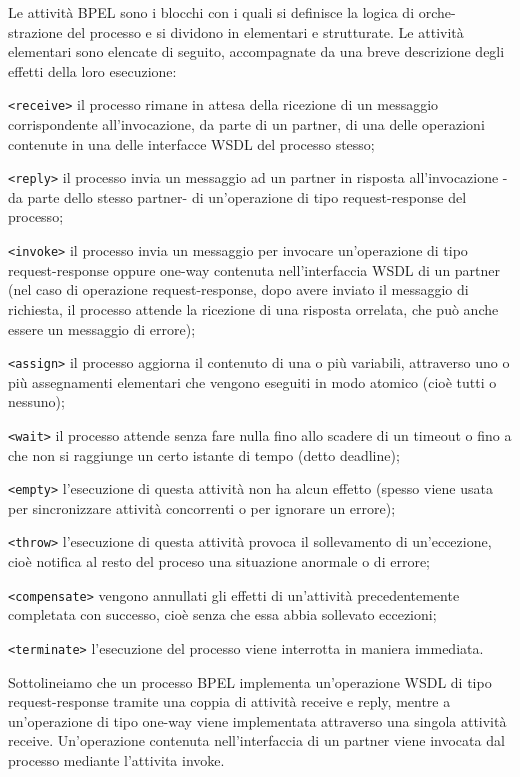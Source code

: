 Le attività BPEL sono i blocchi con i quali si definisce la logica di orche-
strazione del processo e si dividono in elementari e strutturate. Le attività
elementari sono elencate di seguito, accompagnate da una breve descrizione
degli effetti della loro esecuzione:

\texttt{<receive>} il processo rimane in attesa della ricezione di un messaggio
     corrispondente all'invocazione, da parte di un partner, di una delle
     operazioni contenute in una delle interfacce WSDL del processo stesso;

\texttt{<reply>} il processo invia un messaggio ad un partner in risposta
all'invocazione -da parte dello stesso partner- di un'operazione di tipo
request-response del processo;

\texttt{<invoke>} il processo invia un messaggio per invocare un'operazione di
tipo request-response oppure one-way contenuta nell'interfaccia WSDL di
un partner (nel caso di operazione request-response, dopo avere inviato
il messaggio di richiesta, il processo attende la ricezione di una risposta
orrelata, che può anche essere un messaggio di errore);

\texttt{<assign>} il processo aggiorna il contenuto di una o più variabili,
attraverso uno o più assegnamenti elementari che vengono eseguiti in modo atomico (cioè
tutti o nessuno); 

\texttt{<wait>} il processo attende senza fare nulla fino allo scadere di un
timeout o fino a che non si raggiunge un certo istante di tempo (detto deadline);
     
\texttt{<empty>} l'esecuzione di questa attività non ha alcun effetto (spesso
viene usata per sincronizzare attività concorrenti o per ignorare un errore);
                                     
\texttt{<throw>} l’esecuzione di questa attività provoca il sollevamento di
un'eccezione, cioè notifica al resto del proceso una situazione anormale o di errore;

\texttt{<compensate>} vengono annullati gli effetti di un'attività
precedentemente completata con successo, cioè senza che essa abbia sollevato eccezioni;

\texttt{<terminate>} l'esecuzione del processo viene interrotta in maniera
immediata.

Sottolineiamo che un processo BPEL implementa un'operazione WSDL di tipo 
request-response tramite una coppia di attività receive e reply, mentre a
un'operazione di tipo one-way viene implementata attraverso una singola
attività receive. Un'operazione contenuta nell'interfaccia di un partner viene
invocata dal processo mediante l'attivita invoke.

